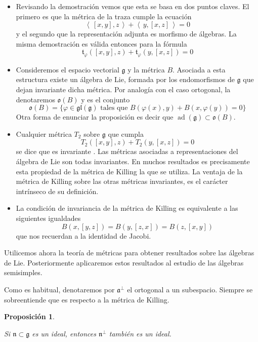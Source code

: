 \documentclass[a4paper,draft,12pt]{scrartcl}
\newtheorem{propo}[teo]{Proposición}%
\newcommand{\g}{\mathfrak{g}}%
\newcommand{\escalar}[2]{\left\langle\, #1,#2\, \right\rangle}  %
\newcommand{\df}[1]{\textsf{\color{blue}#1}}
\DeclareMathOperator{\ad}{ad}  %
\begin{document}

\begin{itemize}

\item Revisando la demostración vemos que esta  se basa en dos puntos claves.  El primero es que la métrica de la traza cumple la ecuación
$$
\escalar{[x,y]}{z}+\escalar{y}{[x,z]}=0
$$
y el segundo que la representación adjunta es morfismo de álgebras.  La misma demostración es válida entonces para la fórmula
$$
\mathfrak{t}_\varphi([x,y],z) + \mathfrak{t}_\varphi(y,[x,z])=0
$$

\item Consideremos el espacio vectorial $\g$ y la métrica $B$.  Asociada a esta estructura existe un álgebra de Lie, formada por los endomorfismos de $ \g$ que dejan invariante dicha métrica.  Por analogía con el caso ortogonal, la denotaremos $\mathfrak{o}(B)$ y es el conjunto
$$
\mathfrak{o}(B)= \{ \varphi \in \mathfrak{gl}(\g) \text{ tales que } B(\varphi(x),y)+ B(x,\varphi(y))=0\}
$$
Otra forma de enunciar la proposición es decir que $\ad(\g) \subset \mathfrak{o}(B)$.

\item Cualquier métrica $T_2$ sobre $\g$ que cumpla
$$
T_2([x,y],z)+T_2(y,[x,z])=0
$$
se dice que es  \df{invariante} .  Las métricas asociadas a representaciones del álgebra de Lie son todas invariantes.  En muchos resultados es precisamente esta propiedad de la métrica de Killing la que se utiliza.  La ventaja de la métrica de Killing sobre las otras métricas invariantes, es el carácter intrínseco de su definición.

\item La condición de invariancia de la métrica de Killing es equivalente a las siguientes igualdades
$$
B(x,[y,z]) = B(y,[z,x])= B(z,[x,y])
$$
que nos recuerdan a la identidad de Jacobi.


\end{itemize}

Utilicemos ahora la teoría de métricas para obtener resultados sobre las álgebras de Lie.  Posteriormente aplicaremos estos resultados al estudio de las álgebras semisimples.

Como es habitual, denotaremos por $\mathfrak{a}^\perp$ el ortogonal a un subespacio.  Siempre se sobreentiende que es respecto a la métrica de Killing.

\begin{propo}\label{propo:ideal}

Si $\mathfrak{n}\subset \g$ es un ideal, entonces $\mathfrak{n}^\perp$ también es un ideal.

\end{propo}
\end{document}
